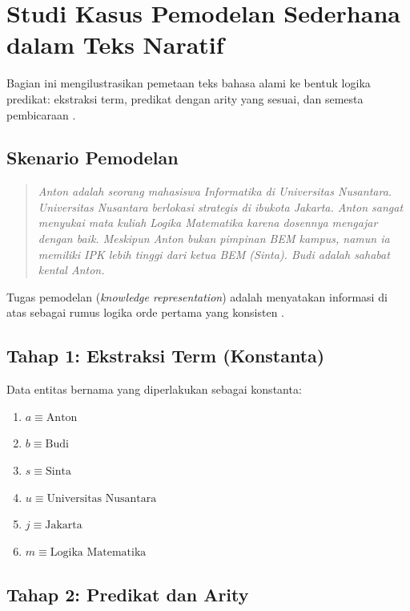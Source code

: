 \section{Studi Kasus Pemodelan Sederhana dalam Teks Naratif}

Bagian ini mengilustrasikan pemetaan teks bahasa alami ke bentuk logika predikat: ekstraksi term, predikat dengan arity yang sesuai, dan semesta pembicaraan \cite{rosen2019}.

\subsection{Skenario Pemodelan}

\begin{quote}
\textit{Anton adalah seorang mahasiswa Informatika di Universitas Nusantara. Universitas Nusantara berlokasi strategis di ibukota Jakarta. Anton sangat menyukai mata kuliah Logika Matematika karena dosennya mengajar dengan baik. Meskipun Anton bukan pimpinan BEM kampus, namun ia memiliki IPK lebih tinggi dari ketua BEM (Sinta). Budi adalah sahabat kental Anton.}
\end{quote}

Tugas pemodelan (\textit{knowledge representation}) adalah menyatakan informasi di atas sebagai rumus logika orde pertama yang konsisten \cite{wiki_first_order_logic}.

\subsection{Tahap 1: Ekstraksi Term (Konstanta)}

Data entitas bernama yang diperlakukan sebagai konstanta:
\begin{enumerate}
    \item $a \equiv \text{Anton}$
    \item $b \equiv \text{Budi}$
    \item $s \equiv \text{Sinta}$
    \item $u \equiv \text{Universitas Nusantara}$
    \item $j \equiv \text{Jakarta}$
    \item $m \equiv \text{Logika Matematika}$
\end{enumerate}

\subsection{Tahap 2: Predikat dan Arity}


